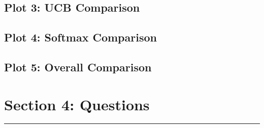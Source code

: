 \documentclass[addpoints,10pt,answers]{exam}
\begin{document}
\subsection*{Plot 3: UCB Comparison}

\subsection*{Plot 4: Softmax Comparison}

\subsection*{Plot 5: Overall Comparison}

\clearpage

\section*{Section 4: Questions}
\hrule\vspace{1em}
\end{document}
